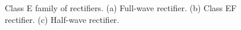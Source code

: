\begin{figure}[!htb]
	\centering
	\caption{Class E family of rectifiers. (a) Full-wave rectifier. (b) Class EF rectifier. (c) Half-wave rectifier.}
	\label{fig:ClassEfamilyrectifier}
\end{figure}

\ifx\allfiles\undefined
	\onehalfspacing
	
	
	
\fi
